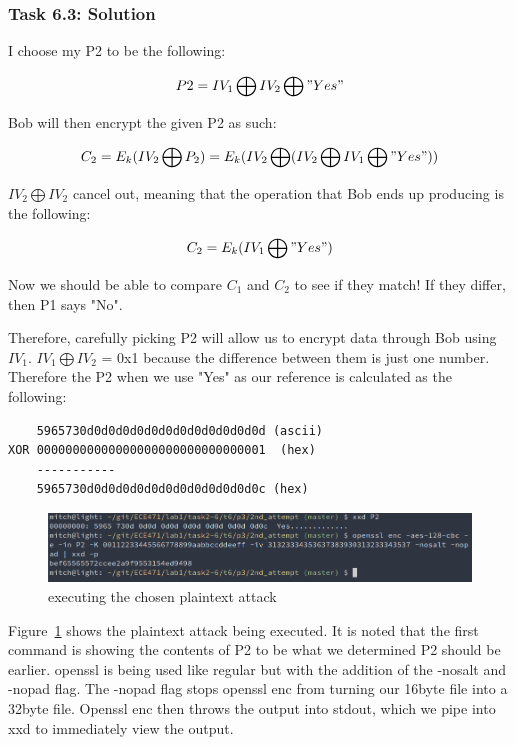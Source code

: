 \documentclass[12pt]{article}
\begin{document}
\clearpage
\subsubsection{Task 6.3: Solution}

I choose my P2 to be the following:

\[ P2 = IV_1 \bigoplus IV_2 \bigoplus "Yes" \]

Bob will then encrypt the given P2 as such:

\[ C_2 = E_{k} (IV_2 \bigoplus P_2 ) = E_{k} (IV_2\bigoplus (IV_2\bigoplus IV_1 \bigoplus "Yes")) \]

$IV_2 \bigoplus IV_2$ cancel out, meaning that the operation that Bob ends up producing is the following:

\[ C_2 = E_k (IV_1 \bigoplus "Yes") \]

Now we should be able to compare $C_1$ and $C_2$ to see if they match! If they differ, then P1 says "No".

Therefore, carefully picking P2 will allow us to encrypt data through Bob using $IV_1$. $IV_1 \bigoplus IV_2$ = 0x1 because the difference between them is just one number. Therefore the P2 when we use "Yes" as our reference is calculated as the following:

\begin{verbatim}
    5965730d0d0d0d0d0d0d0d0d0d0d0d0d (ascii)
XOR 00000000000000000000000000000001  (hex)
    -----------
    5965730d0d0d0d0d0d0d0d0d0d0d0d0c (hex)
\end{verbatim}

\begin{figure}[H]
    \begin{center}
        \includegraphics[scale=0.55]{t6p3.png}
    \end{center}{}
    \caption{executing the chosen plaintext attack}
    \label{fig:t6p3}
\end{figure}

Figure~\ref{fig:t6p3} shows the plaintext attack being executed. It is noted that the first command is showing the contents of P2 to be what we determined P2 should be earlier. openssl is being used like regular but with the addition of the -nosalt and -nopad flag. The -nopad flag stops openssl enc from turning our 16byte file into a 32byte file. Openssl enc then throws the output into stdout, which we pipe into xxd to immediately view the output.
\end{document}
